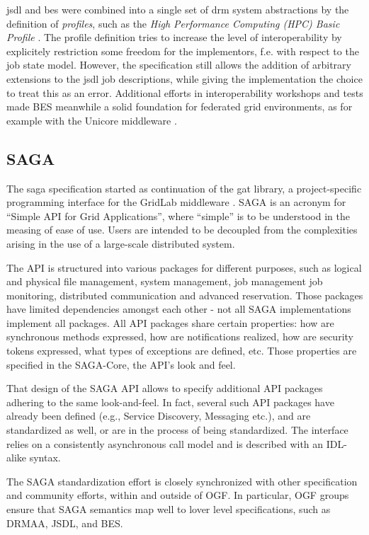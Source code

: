 \documentclass[twocolumn]{svjour3}       %
\begin{document}
\gls{jsdl} and \gls{bes} were combined into a single set of \gls{drm} system abstractions by the definition of \emph{profiles}, such as the \emph{High Performance Computing (HPC) Basic Profile} \cite{citemaster_9643}. The profile definition tries to increase the level of interoperability by explicitely restriction some freedom for the implementors, f.e. with respect to the job state model. However, the specification still allows the addition of arbitrary extensions to the \gls{jsdl} job descriptions, while giving the implementation the choice to treat this as an error. Additional efforts in interoperability workshops and tests made BES meanwhile a solid foundation for federated grid environments, as for example with the Unicore middleware \cite{citemaster_9641}.

\subsection{SAGA}

The \gls{saga} specification \cite{saga} started as continuation of the \gls{gat} library, a project-specific programming interface for the GridLab middleware \cite{allen03enabling}. SAGA is an acronym for ``Simple API for Grid Applications'', where ``simple'' is to be understood in the measing of ease of use. Users are intended to be decoupled from the complexities arising in the use of a large-scale distributed system. 

The API is structured into various packages for different purposes, such as logical and physical file management, system management, job management job monitoring, distributed communication and advanced reservation.  Those packages have limited dependencies amongst each other - not all SAGA implementations implement all packages.  All API packages share certain properties: how are synchronous methods expressed, how are notifications realized, how are security tokens expressed, what types of exceptions are defined, etc.  Those properties are specified in the SAGA-Core, the API's look and feel.

That design of the SAGA API allows to specify additional API packages adhering to the same look-and-feel.  In fact, several such API packages have already been defined (e.g., Service Discovery, Messaging etc.), and are standardized as well, or are in the process of being standardized. The interface relies on a consistently asynchronous call model and is described with an IDL-alike syntax.

The SAGA standardization effort is closely synchronized with other specification and community efforts, within and outside of OGF.  In particular, OGF groups ensure that SAGA semantics map well to lover level specifications, such as DRMAA, JSDL, and BES.
\end{document}
